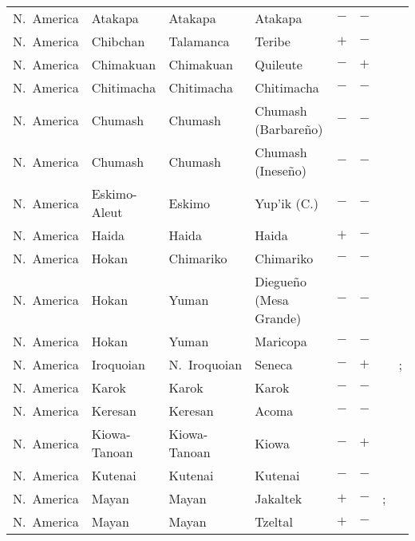 \begin{landscape}
\begin{longtable}{l>{\raggedright\arraybackslash}p{2.2cm}>{\raggedright}p{2.5cm}>{\raggedright\arraybackslash}p{2.5cm}cc>{\raggedright\arraybackslash}p{3.4cm}>{\raggedright\arraybackslash}p{3.4cm}}
N.~America & Atakapa & Atakapa & Atakapa & $-$ & $-$ & \citealt{Gil2013} & \citealt[125, 136--140]{Swanton1929}\\
N.~America & Chibchan & Talamanca & Teribe & $+$ & $-$ & \citealt{Gil2013} & \citealt[passim]{Quesada2010}\\
N.~America & Chimakuan & Chimakuan & Quileute & $-$ & $+$ & \citealt{Gil2013} & \citealt[299]{Nichols1992}\\
N.~America & Chitimacha & Chitimacha & Chitimacha & $-$ & $-$ & \citealt{Gil2013} & \citealt[52--53, 78--85]{Granberry2004}\\
N.~America & Chumash & Chumash & Chumash (Barbareño) & $-$ & $-$ & \citealt{Gil2013} & \citealt[passim]{Wash2001}\\
N.~America & Chumash & Chumash & Chumash (Ineseño) & $-$ & $-$ & \citealt{Gil2013} & \citealt[passim]{Applegate1972}\\
N.~America & Eskimo-Aleut & Eskimo & Yup'ik (C.) & $-$ & $-$ & \citealt[201--207]{Reed1977}& \citealt{Corbett2013}\\
N.~America & Haida & Haida & Haida & $+$ & $-$ & \citealt{Gil2013} & \citealt{Corbett2013}\\
N.~America & Hokan & Chimariko & Chimariko & $-$ & $-$ & \citealt{Gil2013} & \citealt{Corbett2013}\\
N.~America & Hokan & Yuman & Diegueño (Mesa Grande) & $-$ & $-$ & \citealt[299]{Nichols1992} & \citealt[299]{Nichols1992}\\
N.~America & Hokan & Yuman & Maricopa & $-$ & $-$ & \citealt{Gil2013} & \citealt{Corbett2013}\\
N.~America & Iroquoian & N.~Iroquoian & Seneca & $-$ & $+$ & \citealt{Gil2013} & \citealt{Corbett2013}; \citealt[13--22]{Chafe1967}\\
N.~America & Karok & Karok & Karok & $-$ & $-$ & \citealt{Gil2013} & \citealt{Corbett2013}\\
N.~America & Keresan & Keresan & Acoma & $-$ & $-$ & \citealt{Gil2013} & \citealt{Corbett2013}\\
N.~America & Kiowa-Tanoan & Kiowa-Tanoan & Kiowa & $-$ & $+$ & \citealt{Gil2013} & \citealt[59--67]{Sutton2010}\\
N.~America & Kutenai & Kutenai & Kutenai & $-$ & $-$ & \citealt{Gil2013} & \citealt{Corbett2013}\\
N.~America & Mayan & Mayan & Jakaltek & $+$ & $-$ & \citealt{Gil2013}; \citealt[244]{Craig1986} & \citealt[passim]{Day1973}\\
N.~America & Mayan & Mayan & Tzeltal & $+$ & $-$ & \citealt{Gil2013} & \citealt[171--172]{Kaufman1963}\\

\end{longtable}
\end{landscape}
